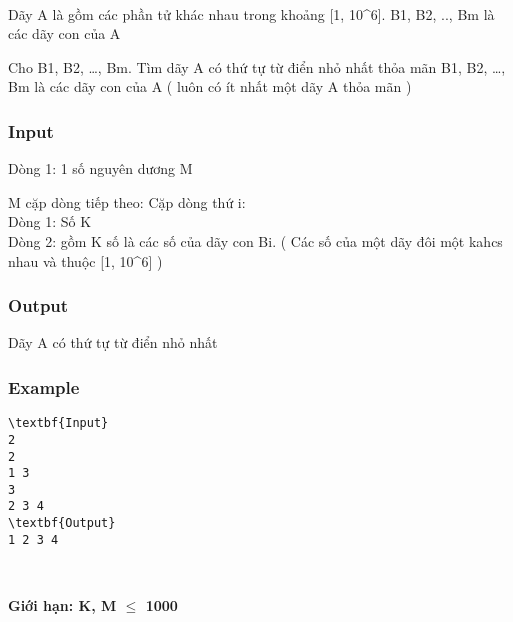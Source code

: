 

 

Dãy A là gồm các phần tử khác nhau trong khoảng [1, 10^6]. B1, B2, .., Bm là các dãy con của A

Cho B1, B2, …, Bm. Tìm dãy A có thứ tự từ điển nhỏ nhất thỏa mãn B1, B2, …, Bm là các dãy con của A ( luôn có ít nhất một dãy A thỏa mãn )

\subsubsection{Input}

Dòng 1: 1 số nguyên dương M

M cặp dòng tiếp theo: Cặp dòng thứ i:
\\Dòng 1: Số K
\\Dòng 2: gồm K số là các số của dãy con Bi. ( Các số của một dãy đôi một kahcs nhau và thuộc [1, 10^6] )

\subsubsection{Output}

Dãy A có thứ tự từ điển nhỏ nhất

\subsubsection{Example}
\begin{verbatim}
\textbf{Input}
2
2
1 3
3
2 3 4
\textbf{Output}
1 2 3 4\end{verbatim}

 

\textbf{Giới hạn: K, M  $\le$  1000}
